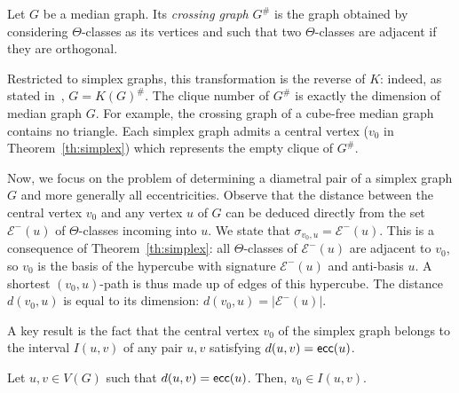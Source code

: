 \documentclass[a4paper,UKenglish,numberwithinsect,cleveref, autoref]{lipics-v2021}
\newcommand{\card}[1]{\left| #1 \right|}
\newcommand{\ecc}{\mbox{\textsf{ecc}}}
\begin{document}


\begin{definition}
Let $G$ be a median graph. Its \textit{crossing graph} $G^{\#}$ is the graph obtained by considering $\Theta$-classes as its vertices and such that two $\Theta$-classes are adjacent if they are orthogonal.
\label{def:crossing}
\end{definition}

Restricted to simplex graphs, this transformation is the reverse of $K$: indeed, as stated in~\cite{KlMu02}, $G = K(G)^{\#}$. The clique number of $G^{\#}$ is exactly the dimension of median graph $G$. For example, the crossing graph of a cube-free median graph contains no triangle. Each simplex graph admits a central vertex ($v_0$ in Theorem~\ref{th:simplex}) which represents the empty clique of $G^{\#}$.

Now, we focus on the problem of determining a diametral pair of a simplex graph $G$ and more generally all eccentricities. Observe that the distance between the central vertex $v_0$ and any vertex $u$ of $G$ can be deduced directly from the set $\mathcal{E}^-(u)$ of $\Theta$-classes incoming into $u$. We state that $\sigma_{v_0,u} = \mathcal{E}^-(u)$. This is a consequence of Theorem~\ref{th:simplex}: all $\Theta$-classes of $\mathcal{E}^-(u)$ are adjacent to $v_0$, so $v_0$ is the basis of the hypercube with signature $\mathcal{E}^-(u)$ and anti-basis $u$. A shortest $(v_0,u)$-path is thus made up of edges of this hypercube. The distance $d(v_0,u)$ is equal to its dimension: $d(v_0,u) = \card{\mathcal{E}^-(u)}$.

A key result is the fact that the central vertex $v_0$ of the simplex graph belongs to the interval $I(u,v)$ of any pair $u,v$ satisfying $d(u,v) = \ecc(u)$.

\begin{lemma}
Let $u,v \in V(G)$ such that $d(u,v) = \ecc(u)$. Then, $v_0 \in I(u,v)$.
\label{le:center_simplex}
\end{lemma}
\end{document}
